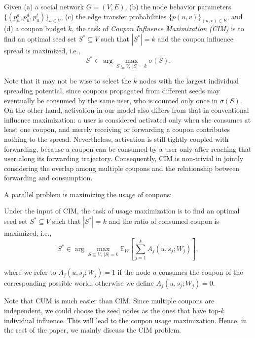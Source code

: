 \documentclass[sigconf]{acmart}
\begin{document}
\begin{definition}
\label{def:cim}
Given (a) a social network $G=(V,E)$,
(b) the node behavior parameters
$\{(p_u^a,p_u^d,p_u^t)\}_{u\in V}$,
(c) the edge transfer probabilities
$\{p(u,v)\}_{(u,v)\in E}$,
and (d) a coupon budget $k$,
the task of \emph{Coupon Influence Maximization (CIM)} is to find an
optimal seed set $S^*\subseteq V$ such that $|S^*|=k$ and the coupon
influence spread is maximized, i.e.,
\begin{equation}
\label{eq:cim}
S^*
\in
\arg\max_{S\subseteq V,\ |S|=k}
\sigma(S).
\end{equation}
\end{definition}

Note that it may not be wise to select the $k$ nodes with the largest
individual spreading potential, since coupons propagated from
different seeds may eventually be consumed by the same user, who is
counted only once in $\sigma(S)$.
On the other hand, activation in our model also differs from that in
conventional influence maximization: a user is considered activated
only when she consumes at least one coupon, and merely receiving or
forwarding a coupon contributes nothing to the spread.
Nevertheless, activation is still tightly coupled with forwarding,
because a coupon can be consumed by a user only after reaching that
user along its forwarding trajectory.
Consequently, CIM is non-trivial in jointly considering the overlap
among multiple coupons and the relationship between forwarding and
consumption.


A parallel problem is maximizing the usage of coupons:
\begin{definition}
\label{def:cum}
Under the input of CIM,
the task of usage maximization is to find an
optimal seed set $S^*\subseteq V$ such that $|S^*|=k$ and the ratio of consumed coupon
 is maximized, i.e.,
\begin{equation}
\label{eq:cum}
S^*
\in
\arg\max_{S\subseteq V,\ |S|=k}
\mathbb{E}_{W}[\sum_{j=1}^{k} A_j(u,s_j;W_j)],
\end{equation}
\end{definition}
where we refer to $A_j(u,s_j;W_j)=1$ if the node $u$ consumes the coupon of the corresponding possible world; otherwise we define $A_j(u,s_j;W_j)=0$.

Note that CUM is much easier than CIM. Since multiple coupons are independent, we could choose the seed nodes as the ones that have top-$k$ individual influence. This will lead to the coupon usage maximization. Hence, in the rest of the paper, we mainly discuss the CIM problem.
\end{document}
